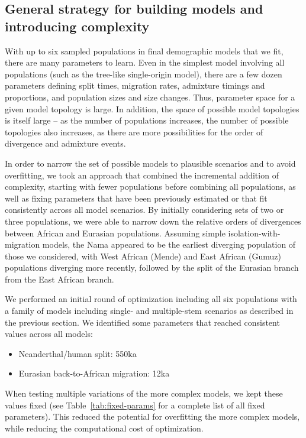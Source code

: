 \documentclass[]{article}
\begin{document}
\subsection{General strategy for building models and introducing complexity}
\label{sec:models}

With up to six sampled populations in final demographic models that we fit,
there are many parameters to learn. Even in the simplest model involving all
populations (such as the tree-like single-origin model), there are a few dozen
parameters defining split times, migration rates, admixture timings and
proportions, and population sizes and size changes. Thus, parameter space for a
given model topology is large. In addition, the space of possible model
topologies is itself large – as the number of populations increases, the number
of possible topologies also increases, as there are more possibilities for the
order of divergence and admixture events. 

In order to narrow the set of possible models to plausible scenarios and to
avoid overfitting, we took an approach that combined the incremental addition
of complexity, starting with fewer populations before combining all
populations, as well as fixing parameters that have been previously estimated
or that fit consistently across all model scenarios. By initially considering
sets of two or three populations, we were able to narrow down the relative
orders of divergences between African and Eurasian populations. Assuming simple
isolation-with-migration models, the Nama appeared to be the earliest diverging
population of those we considered, with West African (Mende) and East African
(Gumuz) populations diverging more recently, followed by the split of the
Eurasian branch from the East African branch.

We performed an initial round of optimization including all six populations
with a family of models including single- and multiple-stem scenarios as
described in the previous section. We identified some parameters that reached
consistent values across all models:
\begin{itemize}
    \item Neanderthal/human split: 550ka
    \item Eurasian back-to-African migration: 12ka
\end{itemize}
When testing multiple variations of the more complex models, we kept these
values fixed (see Table~\ref{tab:fixed-params} for a complete list of all fixed
parameters). This reduced the potential for overfitting the more complex
models, while reducing the computational cost of optimization.
\end{document}
